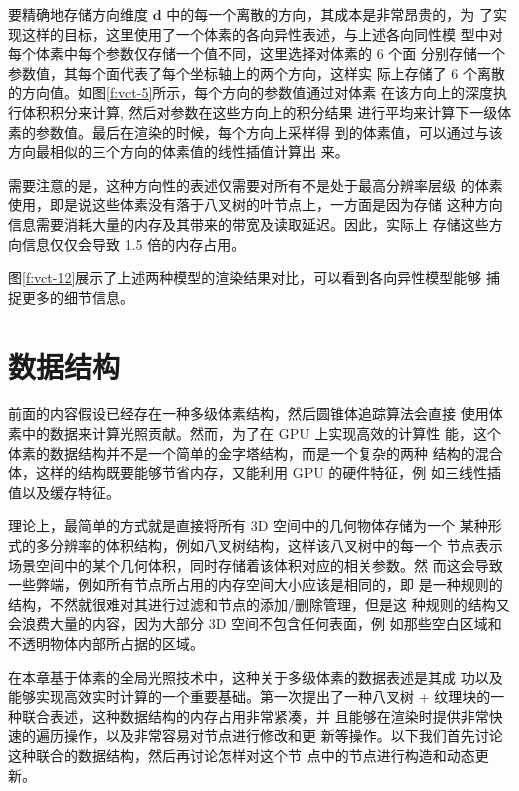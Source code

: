 要精确地存储方向维度 $\mathbf{d}$ 中的每一个离散的方向，其成本是非常昂贵的，为 了实现这样的目标，这里使用了一个体素的各向异性表述，与上述各向同性模 型中对每个体素中每个参数仅存储一个值不同，这里选择对体素的 6 个面 分别存储一个参数值，其每个面代表了每个坐标轴上的两个方向，这样实 际上存储了 6 个离散的方向值。如图\ref{f:vct-5}所示，每个方向的参数值通过对体素 在该方向上的深度执行体积积分来计算, 然后对参数在这些方向上的积分结果 进行平均来计算下一级体素的参数值。最后在渲染的时候，每个方向上采样得 到的体素值，可以通过与该方向最相似的三个方向的体素值的线性插值计算出 来。

需要注意的是，这种方向性的表述仅需要对所有不是处于最高分辨率层级 的体素使用，即是说这些体素没有落于八叉树的叶节点上，一方面是因为存储 这种方向信息需要消耗大量的内存及其带来的带宽及读取延迟。因此，实际上 存储这些方向信息仅仅会导致 1.5 倍的内存占用。

图\ref{f:vct-12}展示了上述两种模型的渲染结果对比，可以看到各向异性模型能够 捕捉更多的细节信息。




\section{数据结构}\label{sec:vct-data-structure}
前面的内容假设已经存在一种多级体素结构，然后圆锥体追踪算法会直接 使用体素中的数据来计算光照贡献。然而，为了在 GPU 上实现高效的计算性 能，这个体素的数据结构并不是一个简单的金字塔结构，而是一个复杂的两种 结构的混合体，这样的结构既要能够节省内存，又能利用 GPU 的硬件特征，例 如三线性插值以及缓存特征。

理论上，最简单的方式就是直接将所有 3D 空间中的几何物体存储为一个 某种形式的多分辨率的体积结构，例如八叉树结构，这样该八叉树中的每一个 节点表示场景空间中的某个几何体积，同时存储着该体积对应的相关参数。然 而这会导致一些弊端，例如所有节点所占用的内存空间大小应该是相同的，即 是一种规则的结构，不然就很难对其进行过滤和节点的添加/删除管理，但是这 种规则的结构又会浪费大量的内容，因为大部分 3D 空间不包含任何表面，例 如那些空白区域和不透明物体内部所占据的区域。

在本章基于体素的全局光照技术中，这种关于多级体素的数据表述是其成 功以及能够实现高效实时计算的一个重要基础。\cite{a:Gigavoxels:Avoxelbasedrenderingpipelineforefficientexplorationoflargeanddetailedscenes}第一次提出了一种八叉树 + 纹理块的一种联合表述，这种数据结构的内存占用非常紧凑，并 且能够在渲染时提供非常快速的遍历操作，以及非常容易对节点进行修改和更 新等操作。以下我们首先讨论这种联合的数据结构，然后再讨论怎样对这个节 点中的节点进行构造和动态更新。



